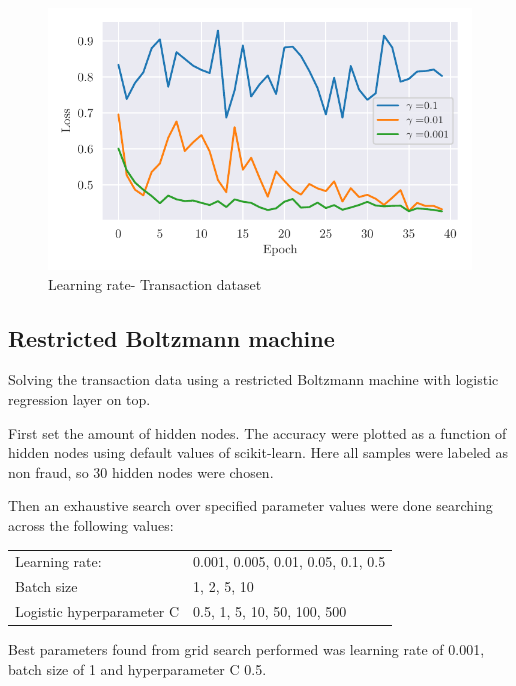 \documentclass[../main.tex]{subfiles}
\begin{document}
\begin{figure}
    \begin{center}
        \includegraphics{figures/H2_lr_fraud_tr.pdf}
        \caption{Learning rate- Transaction dataset}
        \label{fig:1}
    \end{center}
\end{figure}

\subsection{Restricted Boltzmann machine}
Solving the transaction data using a restricted Boltzmann machine with logistic regression layer on top.

First set the amount of hidden nodes. The accuracy were plotted as a function of hidden nodes using default values of scikit-learn. Here all samples were labeled as non fraud, so 30 hidden nodes were chosen.

Then an exhaustive search over specified parameter values were done searching across the following values:

\begin{center}
\begin{tabular}{l l}
 Learning rate: & 0.001, 0.005, 0.01, 0.05, 0.1, 0.5 \\ 
 Batch size & 1, 2, 5, 10  \\  
 Logistic hyperparameter C & 0.5, 1, 5, 10, 50, 100, 500    
\end{tabular}
\end{center}

Best parameters found from grid search performed was learning rate of 0.001, batch size of 1 and hyperparameter C 0.5.
\end{document}
